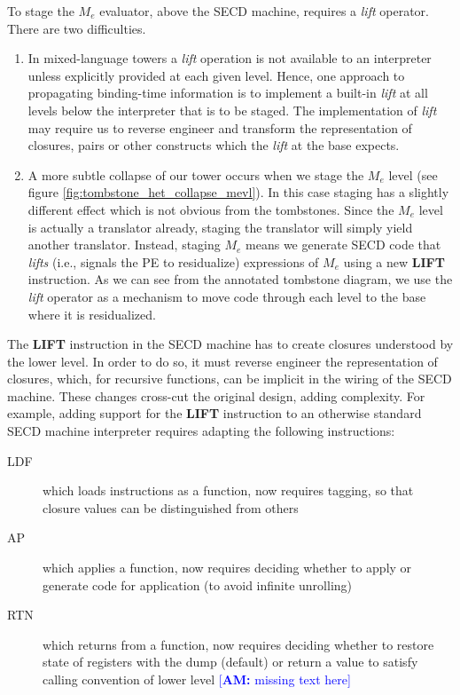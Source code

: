 \documentclass[sigplan,anonymous,review]{acmart}
\newcommand{\AMcomment}[1]{\textcolor{blue}{[\textbf{AM:} #1]}}
\newcommand{\mevl}{$M_{e}$}
\theoremstyle{definition}
\begin{document}
To stage the \mevl{} evaluator, above the SECD machine, requires a \textit{lift} operator. There are two difficulties.
\begin{enumerate}
\item
In mixed-language towers a \textit{lift} operation is not available to an interpreter unless explicitly provided at each given level.
Hence, one approach to propagating binding-time information is to implement a built-in \textit{lift} at all levels below the interpreter that is to be staged. The implementation of \textit{lift} may require us to reverse engineer and transform the representation of closures, pairs or other constructs which the \textit{lift} at the base expects.

\item
A more subtle collapse of our tower occurs when we stage the \mevl{} level (see figure \ref{fig:tombstone_het_collapse_mevl}). In this case staging has a slightly different effect which is not obvious from the tombstones. Since the \mevl{} level is actually a translator already, staging the translator will simply yield another translator. Instead, staging \mevl{} means we generate SECD code that \textit{lifts} (i.e., signals the PE to residualize) expressions of \mevl{} using a new \textbf{LIFT} instruction. As we can see from the annotated tombstone diagram, we use the \textit{lift} operator as a mechanism to move code through each level to the base where it is residualized.
\end{enumerate}

The \textbf{LIFT} instruction in the SECD machine has to create
closures understood by the lower level. In order to do so, it must
reverse engineer the representation of closures, which, for recursive
functions, can be implicit in the wiring of the SECD machine. These changes cross-cut the original design, adding complexity.
For example, adding support for the \textbf{LIFT} instruction to an otherwise standard SECD machine interpreter
requires adapting the following instructions:
\begin{description}
\item [LDF] which loads instructions as a function, now requires tagging, so that closure values can be distinguished from others
\item [AP ] which applies a function, now requires deciding whether to apply or generate code for application (to avoid infinite unrolling)
\item [RTN] which returns from a function, now requires deciding whether to restore state of registers with the dump (default) or return a value to satisfy calling convention of lower level
\AMcomment{missing text here}
\end{description}
\end{document}
